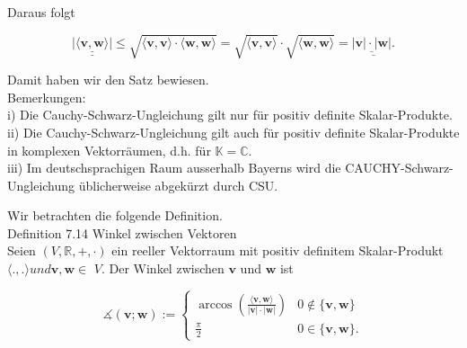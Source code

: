 \documentclass[10pt]{article}
\begin{document}
Daraus folgt


\begin{equation*}
\underline{\underline{|\langle\mathbf{v}, \mathbf{w}\rangle|}} \leq \sqrt{\langle\mathbf{v}, \mathbf{v}\rangle \cdot\langle\mathbf{w}, \mathbf{w}\rangle}=\sqrt{\langle\mathbf{v}, \mathbf{v}\rangle} \cdot \sqrt{\langle\mathbf{w}, \mathbf{w}\rangle}=\underline{\underline{|\mathbf{v}| \cdot|\mathbf{w}|} .} \tag{7.89}
\end{equation*}


Damit haben wir den Satz bewiesen.\\
Bemerkungen:\\
i) Die Cauchy-Schwarz-Ungleichung gilt nur für positiv definite Skalar-Produkte.\\
ii) Die Cauchy-Schwarz-Ungleichung gilt auch für positiv definite Skalar-Produkte in komplexen Vektorräumen, d.h. für $\mathbb{K}=\mathbb{C}$.\\
iii) Im deutschsprachigen Raum ausserhalb Bayerns wird die CAUCHY-Schwarz- Ungleichung üblicherweise abgekürzt durch CSU.

Wir betrachten die folgende Definition.\\
Definition 7.14 Winkel zwischen Vektoren\\
Seien $(V, \mathbb{R},+, \cdot)$ ein reeller Vektorraum mit positiv definitem Skalar-Produkt $\langle.,$.$\rangle und \mathbf{v}, \mathbf{w} \in$ $V$. Der Winkel zwischen $\mathbf{v}$ und $\mathbf{w}$ ist

\[
\measuredangle(\mathbf{v} ; \mathbf{w}):=\left\{\begin{array}{c|c}
\arccos \left(\frac{\langle\mathbf{v}, \mathbf{w}\rangle}{|\mathbf{v}| \cdot|\mathbf{w}|}\right) & 0 \notin\{\mathbf{v}, \mathbf{w}\}  \tag{7.90}\\
\frac{\pi}{2} & 0 \in\{\mathbf{v}, \mathbf{w}\} .
\end{array}\right.
\]
\end{document}
